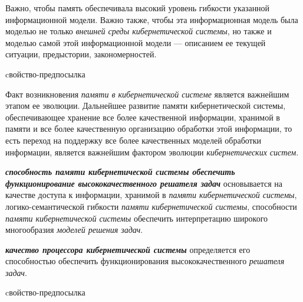 Важно, чтобы память обеспечивала высокий уровень гибкости указанной информационной модели. Важно также, чтобы эта информационная модель была моделью не только \textit{внешней среды кибернетической системы}, но также и моделью самой этой информационной модели --- описанием ее текущей ситуации, предыстории, закономерностей.

\begin{SCn}
\begin{scnrelfromlist}{cвойство-предпосылка}
\end{scnrelfromlist}
\end{SCn}

Факт возникновения \textit{памяти в кибернетической системе} является важнейшим этапом ее эволюции.
Дальнейшее развитие памяти кибернетической системы, обеспечивающее хранение все более качественной информации, хранимой в памяти и все более качественную организацию обработки этой информации, то есть переход на поддержку все более качественных моделей обработки информации, является важнейшим фактором эволюции \textit{кибернетических систем}.

\textbf{\textit{способность \textit{памяти кибернетической системы} обеспечить функционирование высококачественного \textit{решателя задач}}} основывается на качестве доступа к информации, хранимой в \textit{памяти кибернетической системы}, логико-семантической гибкости \textit{памяти кибернетической системы}, способности \textit{памяти кибернетической системы} обеспечить интерпретацию широкого многообразия \textit{моделей решения задач}.

\textbf{\textit{качество процессора кибернетической системы}} определяется его способностью обеспечить функционирования высококачественного \textit{решателя задач}.

\begin{SCn}
\begin{scnrelfromlist}{cвойство-предпосылка}
\end{scnrelfromlist}
\end{SCn}

